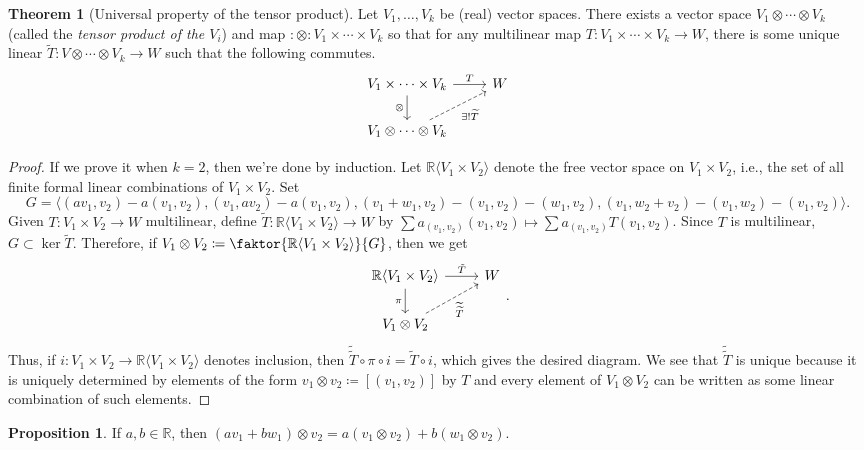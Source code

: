 \documentclass[10pt,letterpaper,cm]{nupset}
\theoremstyle{definition}
\theoremstyle{theorem}
\newtheorem{theorem}[definition]{Theorem}
\newtheorem{prop}[definition]{Proposition}
\theoremstyle{remark}
\newcommand{\R}{\mathbb R}
\newcommand{\1}{\mathbf{1}}
\newcommand{\0}{\vec 0}
\begin{document}
\begin{theorem}[Universal property of the tensor product]
Let $V_1, \ldots, V_k$ be (real) vector spaces. There exists a vector space $V_1 \otimes \cdots \otimes V_k$ (called the \textit{tensor product of the $V_i$}) and map $:\otimes : V_1\times \cdots \times V_k$ so that for any multilinear map $T: V_1 \times \cdots \times V_k \to W$, there is some unique linear $\widetilde{T} : V \otimes \cdots \otimes V_k \to W$ such that the following commutes.
\[
\begin{tikzcd}
V_1 \times \cdots \times V_k \arrow[d, "\otimes"'] \arrow[r, "T"] & W \\
V_1 \otimes \cdots \otimes V_k \arrow[ru, "\exists! \widetilde{T}"', dashed] & 
\end{tikzcd}
\]
\end{theorem}
\begin{proof}
If we prove it when $k=2$, then we're done by induction. Let $\R\langle V_1 \times V_2 \rangle$ denote the free vector space on $V_1 \times V_2$, i.e., the set of all finite formal linear combinations of $V_1 \times V_2$. Set $$G = \langle (av_1, v_2) - a(v_1, v_2), (v_1, av_2) - a(v_1, v_2), (v_1 + w_1, v_2) - (v_1, v_2)-(w_1, v_2), (v_1, w_2 + v_2) - (v_1, w_2) -(v_1, v_2)\rangle.$$
Given $T: V_1 \times V_2 \to W$ multilinear, define $\widetilde{T} : \R\langle V_1 \times V_2\rangle \to W$ by $\sum a_{(v_1, v_2)}(v_1, v_2) \mapsto \sum a_{(v_1, v_2)} T(v_1, v_2)$. Since $T$ is multilinear, $G \subset \ker \widetilde{T}$. Therefore, if $V_1 \otimes V_2 \coloneqq  \faktor{\R\langle V_1 \times V_2 \rangle}{G}$, then we get 
\[
\begin{tikzcd}
\R\langle V_1 \times V_2 \rangle \arrow[d, "\pi"'] \arrow[r, "\tilde{T}"] & W \\
V_1 \otimes V_2 \arrow[ru, "\widetilde{\widetilde{T}}"', dashed] & 
\end{tikzcd}.
\]
Thus, if $i: V_1 \times V_2 \to \R\langle V_1 \times V_2 \rangle$ denotes inclusion, then $\widetilde{\widetilde{T}} \circ \pi \circ i = \widetilde{T} \circ i$, which gives the desired diagram. We see that $\widetilde{\widetilde{T}}$ is unique because it is uniquely determined by elements of the form $v_1 \otimes v_2\coloneqq  [(v_1, v_2)]$ by $T$ and every element of $V_1 \otimes V_2$ can be written as some linear combination of such elements.
\end{proof}

\begin{prop}
If $a,b \in \R$, then $(av_1 + bw_1) \otimes v_2 = a(v_1 \otimes v_2) + b(w_1 \otimes v_2)$.
\end{prop}
\end{document}
